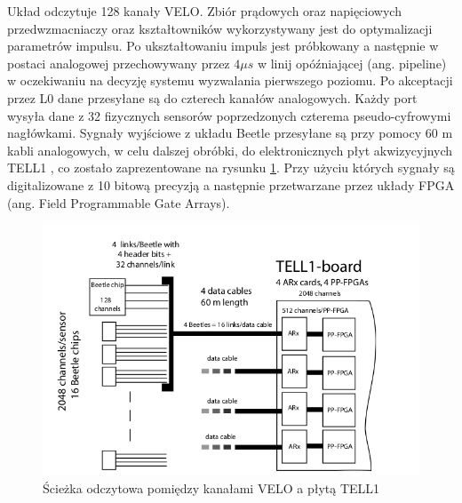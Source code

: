 Układ odczytuje 128 kanały VELO. Zbiór prądowych oraz napięciowych przedwzmacniaczy oraz kształtowników wykorzystywany jest do optymalizacji parametrów impulsu. 
Po ukształtowaniu impuls jest próbkowany a następnie w postaci analogowej przechowywany przez $4\mu s$ w linij opóźniającej (ang. pipeline) w oczekiwaniu na decyzję systemu wyzwalania pierwszego poziomu. Po akceptacji przez L0 dane przesyłane są do czterech kanałów analogowych. Każdy port wysyła dane z 32 fizycznych sensorów poprzedzonych czterema pseudo-cyfrowymi nagłówkami.
Sygnały wyjściowe z układu Beetle przesyłane są przy pomocy 60 m kabli analogowych, w celu dalszej obróbki, do elektronicznych płyt akwizycyjnych TELL1 \cite{Aras}, co zostało zaprezentowane na rysunku \ref{sciezka}. Przy użyciu których sygnały są digitalizowane z 10 bitową precyzją a następnie przetwarzane przez układy FPGA (ang. Field Programmable Gate Arrays). 
\begin{figure}[ht]
 \centering
 \includegraphics[scale=0.9]{rozdzial2/Velo_schematic.png}
 \caption{Ścieżka odczytowa pomiędzy kanałami VELO a płytą TELL1\cite{Aras}}
 \label{sciezka}
\end{figure}





